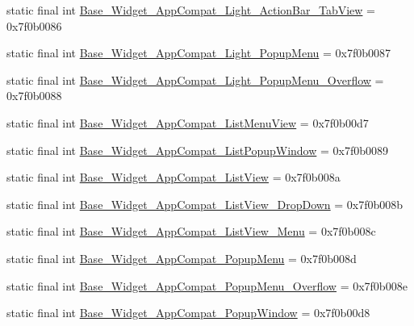 \begin{CompactItemize}
\item 
static final int \hyperlink{classandroid_1_1support_1_1v7_1_1recyclerview_1_1_r_1_1style_070085cea9e871e10c66ad953ea1b606}{Base\_\-Widget\_\-AppCompat\_\-Light\_\-ActionBar\_\-TabView} = 0x7f0b0086
\item 
static final int \hyperlink{classandroid_1_1support_1_1v7_1_1recyclerview_1_1_r_1_1style_f08ce13fd2d0f47e1aff1e90aa8c150a}{Base\_\-Widget\_\-AppCompat\_\-Light\_\-PopupMenu} = 0x7f0b0087
\item 
static final int \hyperlink{classandroid_1_1support_1_1v7_1_1recyclerview_1_1_r_1_1style_6e1829a249900c80277c10facd3fd5c4}{Base\_\-Widget\_\-AppCompat\_\-Light\_\-PopupMenu\_\-Overflow} = 0x7f0b0088
\item 
static final int \hyperlink{classandroid_1_1support_1_1v7_1_1recyclerview_1_1_r_1_1style_901e70a6e0cf3cf81aaeb9a2394ab67d}{Base\_\-Widget\_\-AppCompat\_\-ListMenuView} = 0x7f0b00d7
\item 
static final int \hyperlink{classandroid_1_1support_1_1v7_1_1recyclerview_1_1_r_1_1style_a30ee614fd67ee1c2201ba70c79991cf}{Base\_\-Widget\_\-AppCompat\_\-ListPopupWindow} = 0x7f0b0089
\item 
static final int \hyperlink{classandroid_1_1support_1_1v7_1_1recyclerview_1_1_r_1_1style_4aad5c3d06134c4bdf24a88af0027e15}{Base\_\-Widget\_\-AppCompat\_\-ListView} = 0x7f0b008a
\item 
static final int \hyperlink{classandroid_1_1support_1_1v7_1_1recyclerview_1_1_r_1_1style_927dd8e950d7c08f0bf6c658e9d5b381}{Base\_\-Widget\_\-AppCompat\_\-ListView\_\-DropDown} = 0x7f0b008b
\item 
static final int \hyperlink{classandroid_1_1support_1_1v7_1_1recyclerview_1_1_r_1_1style_1ed2e5076cb86995e766504fb716840f}{Base\_\-Widget\_\-AppCompat\_\-ListView\_\-Menu} = 0x7f0b008c
\item 
static final int \hyperlink{classandroid_1_1support_1_1v7_1_1recyclerview_1_1_r_1_1style_195b4ab48e5fb75d6c341ab025a46636}{Base\_\-Widget\_\-AppCompat\_\-PopupMenu} = 0x7f0b008d
\item 
static final int \hyperlink{classandroid_1_1support_1_1v7_1_1recyclerview_1_1_r_1_1style_9523030dfd0b16feaa76a145aa16ca74}{Base\_\-Widget\_\-AppCompat\_\-PopupMenu\_\-Overflow} = 0x7f0b008e
\item 
static final int \hyperlink{classandroid_1_1support_1_1v7_1_1recyclerview_1_1_r_1_1style_86fdbbccdfdf82f2edf3cd2e42ac1396}{Base\_\-Widget\_\-AppCompat\_\-PopupWindow} = 0x7f0b00d8
\item 

\end{CompactItemize}
